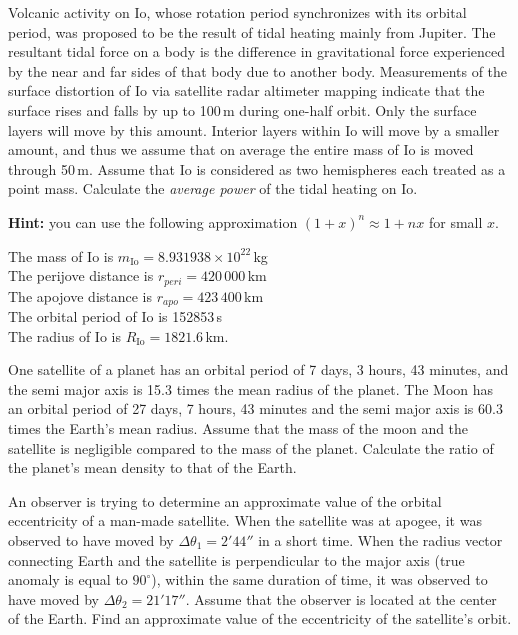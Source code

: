 Volcanic activity on Io, whose rotation period synchronizes with its orbital
period, was proposed to be the result of tidal heating mainly from Jupiter.
The resultant tidal force on a body is the difference in gravitational force
experienced by the near and far sides of that body due to another body.
Measurements of the surface distortion of Io via satellite radar altimeter
mapping indicate that the surface rises and falls by up to 100\,m during
one-half orbit. Only the surface layers will move by this amount. Interior
layers within Io will move by a smaller amount, and thus we assume that on
average the entire mass of Io is moved through 50\,m. Assume that Io is
considered as two hemispheres each treated as a point mass. Calculate the
\emph{average power} of the tidal heating on Io.

\textbf{Hint:} you can use the following approximation
$(1+x)^n \approx 1 + nx$ for small $x$.

The mass of Io is $m_{\mathrm{Io}} = 8.931938 \times 10^{22}$\,kg\\
The perijove distance is $r_{peri} = 420\,000$\,km\\
The apojove distance is $r_{apo} = 423\,400$\,km\\
The orbital period of Io is 152853\,s\\
The radius of Io is $R_{\mathrm{Io}} = 1821.6$\,km.

One satellite of a planet has an orbital period of 7 days, 3 hours,
43 minutes, and the semi major axis is 15.3 times the mean radius of the
planet. The Moon has an orbital period of 27 days, 7 hours, 43 minutes and the
semi major axis is 60.3 times the Earth's mean radius. Assume that the mass of
the moon and the satellite is negligible compared to the mass of the planet.
Calculate the ratio of the planet's mean density to that of the Earth.

An observer is trying to determine an approximate value of the orbital
eccentricity of a man-made satellite. When the satellite was at apogee, it was
observed to have moved by $\Delta\theta_1 = 2'44''$ in a short time. When the
radius vector connecting Earth and the satellite is perpendicular to the major
axis (true anomaly is equal to $90^\circ$), within the same duration of time,
it was observed to have moved by $\Delta\theta_2 = 21'17''$. Assume that the
observer is located at the center of the Earth. Find an approximate value of
the eccentricity of the satellite's orbit.


